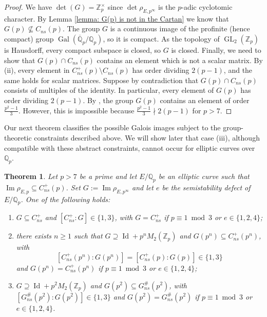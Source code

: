 \documentclass{amsart}
\newcommand{\op}[1]{\operatorname{#1}}
\newtheorem{theorem}{Theorem}
\theoremstyle{definition}
\newcommand{\Z}{\mathbb{Z}}
\newcommand{\Q}{\mathbb{Q}}
\newcommand{\NRep}[1]{\operatorname{Im}\rho_{E,#1}}
\numberwithin{theorem}{section}
\numberwithin{equation}{section}
\begin{document}
\begin{proof}
    We have $\det(G) = \Z_p^\times$ since $\det \rho_{E,p^\infty}$ is the $p$-adic cyclotomic character.
    By Lemma \ref{lemma: G(p) is not in the Cartan} we know that $G(p) \not\subseteq C_{ns}(p)$. 
    The group $G$ is a continuous image of the profinite (hence compact) group $\operatorname{Gal}(\overline{\mathbb{Q}}_p/\mathbb{Q}_p)$, so it is compact. As the topology of $\operatorname{GL}_2(\mathbb{Z}_p)$ is Hausdorff, every compact subspace is closed, so $G$ is closed.
	Finally, we need to show that $G(p) \cap C_{ns}(p)$ contains an element which is not a scalar matrix. By (ii), every element in $C_{ns}^+(p) \setminus C_{ns}(p)$ has order dividing $2(p-1)$, and the same holds for scalar matrices. Suppose by contradiction that $G(p) \cap C_{ns}(p)$ consists of multiples of the identity. In particular, every element of $G(p)$ has order dividing $2(p-1)$.
    By , the group $G(p)$ contains an element of order $\frac{p^2-1}{3}$. However, this is impossible because $\frac{p^2-1}{3} \nmid 2(p-1)$ for $p>7$.
\end{proof}

Our next theorem classifies the possible Galois images subject to the group-theoretic constraints described above. We will show later that case (iii), although compatible with these abstract constraints, cannot occur for elliptic curves over $\Q_p$.

\begin{theorem}\label{thm:ellipticcartantower}
Let $p>7$ be a prime and let $E/\Q_p$ be an elliptic curve such that $\NRep{p} \subseteq C_{ns}^+(p)$. Set $G:=\operatorname{Im}\rho_{E,p^\infty}$ and let $e$ be the semistability defect of $E/\Q_p$. One of the following holds:
	\begin{enumerate}
		\item $G \subseteq C_{ns}^+$ and $[C_{ns}^+ : G] \in \{1,3\}$, with $G=C_{ns}^+$ if $p \equiv 1 \bmod 3$ or $e \in \{1,2,4\}$;
		\item there exists $n \ge 1$ such that $G \supseteq \op{Id} + p^n M_{2}(\Z_p)$ and $G(p^n) \subseteq C_{ns}^+(p^n)$, with 
        \[
        [C_{ns}^+(p^n) : G(p^n)] =[C_{ns}^+(p) : G(p)] \in \{1,3\}
        \]
        and $G(p^n) = C_{ns}^+(p^n)$ if $p \equiv 1 \bmod 3$ or $e \in \{1,2,4\}$;
		\item $G \supseteq \op{Id} + p^2 M_{2}(\Z_p)$ and $G(p^2) \subseteq G_{ns}^\#(p^2)$, with $[G_{ns}^\#(p^2) : G(p^2)] \in \{1,3\}$ and $G(p^2) = G_{ns}^\#(p^2)$ if $p \equiv 1 \bmod 3$ or $e \in \{1,2,4\}$.
	\end{enumerate}
\end{theorem}
\end{document}
